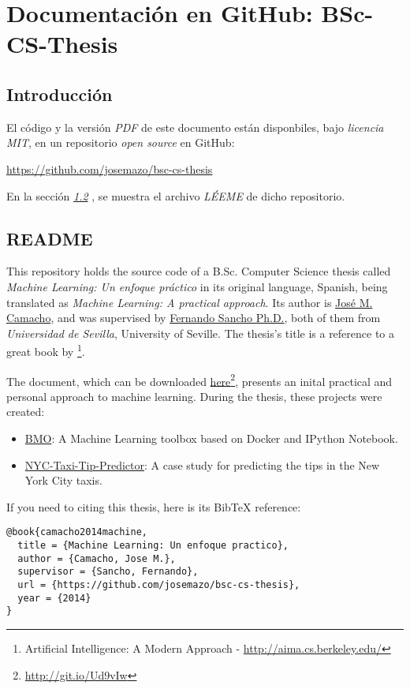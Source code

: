 \chapter{Documentación en GitHub: BSc-CS-Thesis} \label{chap:ap_c}

\vspace*{5mm}

\section{Introducción} \label{sec:c.1}

El código  y la versión \emph{PDF} de este documento están disponbiles, bajo \emph{licencia MIT}, en un repositorio \emph{open source} en GitHub:

\url{https://github.com/josemazo/bsc-cs-thesis}

En la sección \emph{\ref{sec:c.2} }, se muestra el archivo \emph{LÉEME} de dicho repositorio.

\section{README} \label{sec:c.2}

This repository holds the  source code of a B.Sc. Computer Science thesis called \emph{Machine Learning: Un enfoque práctico} in its original language, Spanish, being translated as \emph{Machine Learning: A practical approach}. Its author is \href{https://github.com/josemazo}{José M. Camacho}, and was supervised by \href{http://www.cs.us.es/~fsancho/}{Fernando Sancho Ph.D.}, both of them from \emph{Universidad de Sevilla}, University of Seville. The thesis's title is a reference to a great book by \citeauthor{russell2003artificial}\footnote{Artificial Intelligence: A Modern Approach - \url{http://aima.cs.berkeley.edu/}}.

The document, which can be downloaded \href{https://github.com/josemazo/bsc-cs-thesis/releases/download/deliverable/jose-m-camacho-bsc-cs-thesis.pdf}{here}\footnote{\url{http://git.io/Ud9vIw}}, presents an inital practical and personal approach to machine learning. During the thesis, these projects were created:

\begin{itemize}
\item[\textbullet]\href{https://github.com/josemazo/bmo}{BMO}: A Machine Learning toolbox based on Docker and IPython Notebook.
\item[\textbullet]\href{https://github.com/josemazo/nyc-taxi-tip-predictor}{NYC-Taxi-Tip-Predictor}: A case study for predicting the tips in the New York City taxis.
\end{itemize}

If you need to citing this thesis, here is its BibTeX reference:

\vspace*{3mm}
\lstset{style=bibtex}
\begin{lstlisting}
@book{camacho2014machine,
  title = {Machine Learning: Un enfoque practico},
  author = {Camacho, Jose M.},
  supervisor = {Sancho, Fernando},
  url = {https://github.com/josemazo/bsc-cs-thesis},
  year = {2014}
}
\end{lstlisting}
